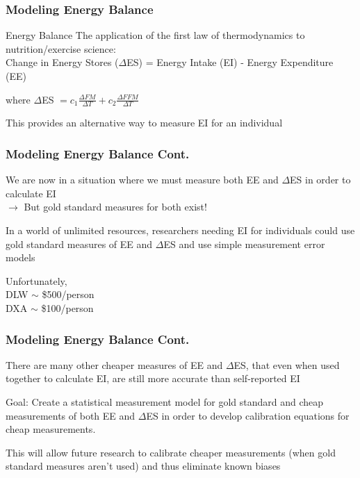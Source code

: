 \documentclass[handout]{beamer}\usepackage[]{graphicx}\usepackage[]{color}
\begin{document}
\begin{frame}
\frametitle{Modeling Energy Balance}

\begin{block}{Energy Balance}
The application of the first law of thermodynamics to nutrition/exercise science: \\
Change in Energy Stores ($\Delta$ES) = Energy Intake (EI) - Energy Expenditure (EE)
\end{block}

where $\Delta$ES $= c_1 \frac{\Delta FM}{\Delta T } + c_2 \frac{\Delta FFM}{\Delta T}$  

\vspace{0.4cm}

This provides an alternative way to measure EI for an individual


\end{frame}

\begin{frame}
\frametitle{Modeling Energy Balance Cont.}
We are now in a situation where we must measure both EE and $\Delta$ES in order to calculate EI \\
$\rightarrow$ But gold standard measures for both exist!

\vspace{0.3cm}

In a world of unlimited resources, researchers needing EI for individuals could use gold standard measures of EE and $\Delta$ES and use simple measurement error models\\

\vspace{0.3cm}

Unfortunately,\\
DLW $\sim$ \$500/person \\
DXA $\sim$ \$100/person

\end{frame}

\begin{frame}
\frametitle{Modeling Energy Balance Cont.}
There are many other cheaper measures of EE and $\Delta$ES, that even when used together to calculate EI, are still more accurate than self-reported EI \\

\vspace{0.4cm}

Goal: Create a statistical measurement model for gold standard and cheap measurements of both EE and $\Delta$ES in order to develop calibration equations for cheap measurements.\\

\vspace{0.4cm}

This will allow future research to calibrate cheaper measurements (when gold standard measures aren't used) and thus eliminate known biases

\end{frame}
\end{document}
